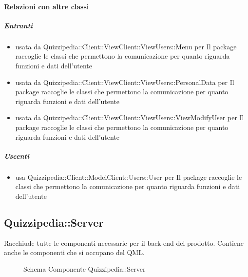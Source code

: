 \paragraph{Relazioni con altre classi}
\subparagraph{Entranti}
\begin{itemize}
\item usata da Quizzipedia::Client::ViewClient::ViewUsers::Menu per Il package raccoglie le classi che permettono la comunicazione per quanto riguarda funzioni e dati dell'utente
\item usata da Quizzipedia::Client::ViewClient::ViewUsers::PersonalData per Il package raccoglie le classi che permettono la comunicazione per quanto riguarda funzioni e dati dell'utente
\item usata da Quizzipedia::Client::ViewClient::ViewUsers::ViewModifyUser per Il package raccoglie le classi che permettono la comunicazione per quanto riguarda funzioni e dati dell'utente
\end{itemize}
\subparagraph{Uscenti}
\begin{itemize}
\item usa Quizzipedia::Client::ModelClient::Users::User per Il package raccoglie le classi che permettono la comunicazione per quanto riguarda funzioni e dati dell'utente
\end{itemize}
\subsection{Quizzipedia::Server}
Racchiude tutte le componenti necessarie per il back-end del prodotto. Contiene anche le componenti che si occupano del QML.
\begin{figure}[H]
\centering
\noindent{}
\caption[Schema Componente Server]{Schema Componente Quizzipedia::Server}
\end{figure}
